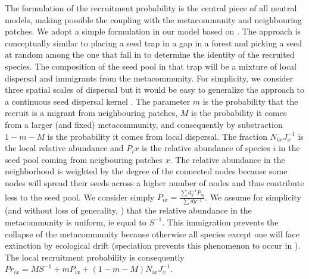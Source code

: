 \documentclass[12pt]{article}
\begin{document}
The formulation of the recruitment probability is the central piece of all neutral models, making possible the coupling with the metacommunity and neighbouring patches. We adopt a simple formulation in our model based on \parencite{Gravel2006}. The approach is conceptually similar to placing a seed trap in a gap in a forest and picking a seed at random among the one that fall in to determine the identity of the recruited species. The composition of the seed pool in that trap will be a mixture of local dispersal and immigrants from the metacommunity. For simplicity, we consider three spatial scales of dispersal but it would be easy to generalize the approach to a continuous seed dispersal kernel \parencite{Gravel2006}. The parameter $m$ is the probability that the recruit is a migrant from neighbouring patches, $M$ is the probability it comes from a larger (and fixed) metacommunity, and consequently by substraction $1-m-M$ is the probability it comes from local dispersal. The fraction $N_{ix}J_x^{-1}$ is the local relative abundance and $P_ix$ is the relative abundance of species $i$ in the seed pool coming from neigbouring patches $x$. The relative abundance in the neighborhood is weighted by the degree of the connected nodes because some nodes will spread their seeds across a higher number of nodes and thus contribute less to the seed pool. We consider simply $P_{ix} =\frac{\sum d_y^{-1}P_{iy}}{\sum dy^{-1}}$.  We assume for simplicity (and without loss of generality, \parencite{Bell2000}) that the relative abundance in the metacommunity is uniform, ie equal to $S^{-1}$. This immigration prevents the collapse of the metacommunity because otherwise all species except one will face extinction by ecological drift (speciation prevents this phenomenon to occur in \textcite{Hubbell2001}). The local recruitment probability is consequently $Pr_{ix} = MS^{-1} + mP_{ix} + (1-m-M)N_{ix}J_x^{-1}$.  
\end{document}
